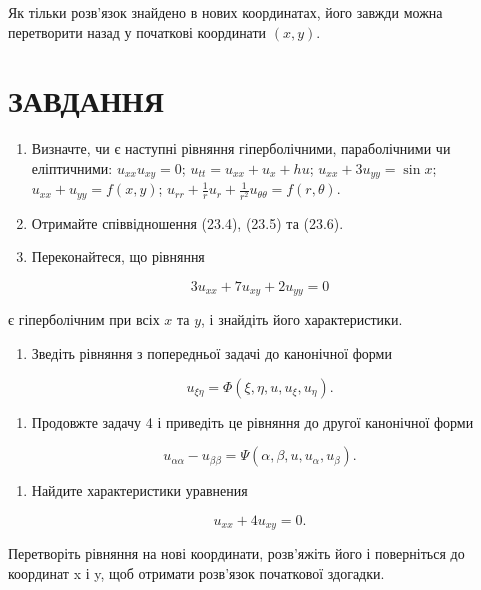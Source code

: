 \documentclass[
  ukrainian,
]{article}
\providecommand{\tightlist}{%
  \setlength{\itemsep}{0pt}\setlength{\parskip}{0pt}}
\begin{document}
Як тільки розв'язок знайдено в нових координатах, його завжди можна
перетворити назад у початкові координати \((x,y)\).

\section{ЗАВДАННЯ}\label{ux437ux430ux432ux434ux430ux43dux43dux44f-16}

\begin{enumerate}
\def\labelenumi{\arabic{enumi}.}
\item
  Визначте, чи є наступні рівняння гіперболічними, параболічними чи
  еліптичними: \(u_{xx}u_{xy}=0\); \(u_{tt}=u_{xx}+u_x+hu\);
  \(u_{xx}+3u_{yy}=\sin x\); \(u_{xx}+u_{yy}=f(x,y)\);
  \(u_{rr}+\frac{1}{r}u_r+\frac{1}{r^2}u_{\theta\theta}=f(r,\theta)\).
\item
  Отримайте співвідношення (23.4), (23.5) та (23.6).
\item
  Переконайтеся, що рівняння
\end{enumerate}

\[3u_{xx} + 7u_{xy} + 2u_{yy} = 0\]

є гіперболічним при всіх \(x\) та \(y\), і знайдіть його характеристики.

\begin{enumerate}
\def\labelenumi{\arabic{enumi}.}
\setcounter{enumi}{3}
\tightlist
\item
  Зведіть рівняння з попередньої задачі до канонічної форми
\end{enumerate}

\[u_{\xi\eta} = \Phi(\xi, \eta, u, u_{\xi}, u_{\eta}).\]

\begin{enumerate}
\def\labelenumi{\arabic{enumi}.}
\setcounter{enumi}{4}
\tightlist
\item
  Продовжте задачу 4 і приведіть це рівняння до другої канонічної форми
\end{enumerate}

\[u_{\alpha\alpha} - u_{\beta\beta} = \Psi(\alpha, \beta, u, u_{\alpha}, u_{\beta}).\]

\begin{enumerate}
\def\labelenumi{\arabic{enumi}.}
\setcounter{enumi}{5}
\tightlist
\item
  Найдите характеристики уравнения
\end{enumerate}

\[u_{xx} + 4u_{xy} = 0.\]

Перетворіть рівняння на нові координати, розв'яжіть його і поверніться
до координат x і y, щоб отримати розв'язок початкової здогадки.
\end{document}
